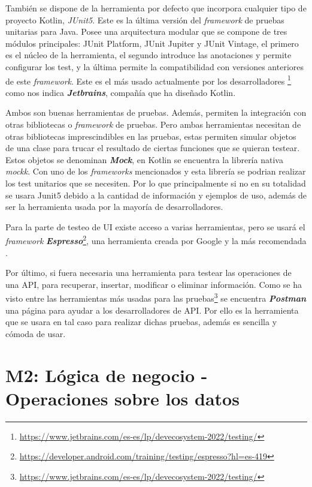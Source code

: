 También se dispone de la herramienta por defecto que incorpora cualquier tipo de proyecto Kotlin, 
\textit{JUnit5}. Este es la última versión del \textit{framework} de pruebas unitarias para Java. Posee 
una arquitectura modular que se compone de tres módulos principales: JUnit Platform, JUnit Jupiter y 
JUnit Vintage, el primero es el núcleo de la herramienta, el segundo introduce las anotaciones y 
permite configurar los test, y la última permite la compatibilidad con versiones anteriores de este 
\textit{framework}. Este es el más usado actualmente por los desarrolladores 
\footnote{\url{https://www.jetbrains.com/es-es/lp/devecosystem-2022/testing/}} como nos indica 
\textbf{\textit{Jetbrains}}, compañía que ha diseñado Kotlin.

Ambos son buenas herramientas de pruebas. Además, permiten la integración con otras bibliotecas o 
\textit{framework} de pruebas. Pero ambas herramientas necesitan de otras bibliotecas imprescindibles 
en las pruebas, estas permiten simular objetos de una clase para trucar el resultado de ciertas 
funciones que se quieran testear. Estos objetos se denominan \textbf{\textit{Mock}}, en Kotlin 
se encuentra la librería nativa \textit{mockk}. Con uno de los \textit{frameworks} 
mencionados y esta librería se podrian realizar los test unitarios que se necesiten. Por lo que principalmente 
si no en su totalidad se usara Junit5 debido a la cantidad de información y ejemplos de uso, además de 
ser la herramienta usada por la mayoría de desarrolladores.

Para la parte de testeo de UI existe acceso a varias herramientas, pero se usará el 
\textit{framework} \textbf{\textit{Espresso}}\footnote{\url{https://developer.android.com/training/testing/espresso?hl=es-419}}, una herramienta creada por Google y la más recomendada \cite{UITest}.

Por último, si fuera necesaria una herramienta para testear las operaciones de una API, para  recuperar, 
insertar, modificar o eliminar información. Como se ha visto entre 
las herramientas más usadas para las pruebas\footnote{\url{https://www.jetbrains.com/es-es/lp/devecosystem-2022/testing/}} se encuentra \textit{\textbf{Postman}} una página para ayudar a los 
desarrolladores de API. Por ello es la herramienta que se usara en tal caso para realizar dichas 
pruebas, además es sencilla y cómoda de usar.

\section{M2: Lógica de negocio - Operaciones sobre los datos}

